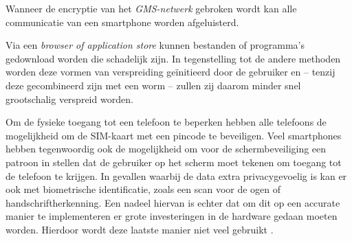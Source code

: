 Wanneer de encryptie van het \emph{GMS-netwerk} gebroken wordt kan alle communicatie van een smartphone worden afgeluisterd. 

Via een \emph{browser of application store} kunnen bestanden of programma's gedownload worden die schadelijk zijn. In tegenstelling tot de andere methoden worden deze vormen van verspreiding ge\"initieerd door de gebruiker en -- tenzij deze gecombineerd zijn met een worm -- zullen zij daarom minder snel grootschalig verspreid worden. 	

Om de fysieke toegang tot een telefoon te beperken hebben alle telefoons de mogelijkheid om de SIM-kaart met een pincode te beveiligen. Veel smartphones hebben tegenwoordig ook de mogelijkheid om voor de schermbeveiliging een patroon in stellen dat de gebruiker op het scherm moet tekenen om toegang tot de telefoon te krijgen. In gevallen waarbij de data extra privacygevoelig is kan er ook met biometrische identificatie, zoals een scan voor de ogen of handschriftherkenning. Een nadeel hiervan is echter dat om dit op een accurate manier te implementeren er grote investeringen in de hardware gedaan moeten worden. Hierdoor wordt deze laatste manier niet veel gebruikt \citep{thirumathyam2010}.  


